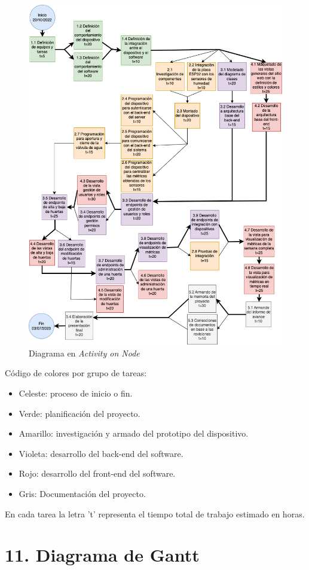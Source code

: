 \documentclass[
11pt, %
codirector, %
]{charter}
\begin{document}
\begin{figure}[htpb]
\centering 
\includegraphics[width=.9\textwidth]{./Figuras/AoN.png}
\caption{Diagrama en \textit{Activity on Node}}
\label{fig:AoN}
\end{figure}


Código de colores por grupo de tareas:
\begin{itemize}
	\item Celeste: proceso de inicio o fin.
	\item Verde: planificación del proyecto.
	\item Amarillo: investigación y armado del prototipo del dispositivo.
	\item Violeta: desarrollo del back-end del software.
	\item Rojo: desarrollo del front-end del software. 
	\item Gris: Documentación del proyecto.
\end{itemize}

En cada tarea la letra 't' representa el tiempo total de trabajo estimado en horas.


\section{11. Diagrama de Gantt}
\label{sec:gantt}
\end{document}
